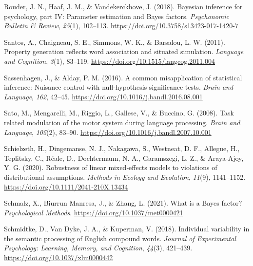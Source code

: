 \documentclass[
  12pt,
  man,floatsintext]{apa7}
\newlength{\cslhangindent}
\newlength{\cslentryspacingunit} %
\newenvironment{CSLReferences}[2] %
 {%
  \setlength{\parindent}{0pt}
  \ifodd #1
  \let\oldpar\par
  \def\par{\hangindent=\cslhangindent\oldpar}
  \fi
  \setlength{\parskip}{#2\cslentryspacingunit}
 }%
 {}
\begin{document}
\begin{CSLReferences}{1}{0}
\leavevmode{}%
Rouder, J. N., Haaf, J. M., \& Vandekerckhove, J. (2018). Bayesian inference for psychology, part {IV}: {Parameter} estimation and {Bayes} factors. \emph{Psychonomic Bulletin \& Review}, \emph{25}(1), 102--113. \url{https://doi.org/10.3758/s13423-017-1420-7}

\leavevmode{}%
Santos, A., Chaigneau, S. E., Simmons, W. K., \& Barsalou, L. W. (2011). Property generation reflects word association and situated simulation. \emph{Language and Cognition}, \emph{3}(1), 83--119. \url{https://doi.org/10.1515/langcog.2011.004}

\leavevmode{}%
Sassenhagen, J., \& Alday, P. M. (2016). A common misapplication of statistical inference: {Nuisance} control with null-hypothesis significance tests. \emph{Brain and Language}, \emph{162}, 42--45. \url{https://doi.org/10.1016/j.bandl.2016.08.001}

\leavevmode{}%
Sato, M., Mengarelli, M., Riggio, L., Gallese, V., \& Buccino, G. (2008). Task related modulation of the motor system during language processing. \emph{Brain and Language}, \emph{105}(2), 83--90. \url{https://doi.org/10.1016/j.bandl.2007.10.001}

\leavevmode{}%
Schielzeth, H., Dingemanse, N. J., Nakagawa, S., Westneat, D. F., Allegue, H., Teplitsky, C., Réale, D., Dochtermann, N. A., Garamszegi, L. Z., \& Araya‐Ajoy, Y. G. (2020). Robustness of linear mixed‐effects models to violations of distributional assumptions. \emph{Methods in Ecology and Evolution}, \emph{11}(9), 1141--1152. \url{https://doi.org/10.1111/2041-210X.13434}

\leavevmode{}%
Schmalz, X., Biurrun Manresa, J., \& Zhang, L. (2021). What is a {Bayes} factor? \emph{Psychological Methods}. \url{https://doi.org/10.1037/met0000421}

\leavevmode{}%
Schmidtke, D., Van Dyke, J. A., \& Kuperman, V. (2018). Individual variability in the semantic processing of {English} compound words. \emph{Journal of Experimental Psychology: Learning, Memory, and Cognition}, \emph{44}(3), 421--439. \url{https://doi.org/10.1037/xlm0000442}


\end{CSLReferences}
\end{document}
